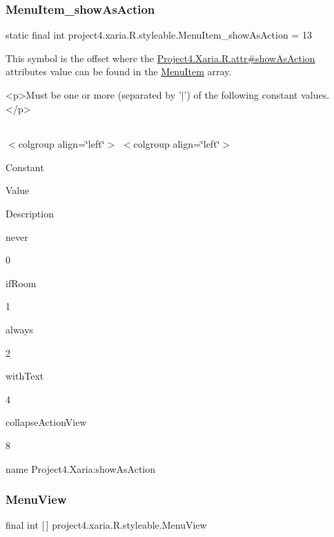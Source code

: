 \subsubsection{\texorpdfstring{Menu\+Item\+\_\+show\+As\+Action}{MenuItem\_showAsAction}}
{\footnotesize\ttfamily static final int project4.\+xaria.\+R.\+styleable.\+Menu\+Item\+\_\+show\+As\+Action = 13\hspace{0.3cm}{\ttfamily [static]}}

This symbol is the offset where the \hyperlink{}{Project4.\+Xaria.\+R.\+attr\#show\+As\+Action} attribute\textquotesingle{}s value can be found in the \hyperlink{classproject4_1_1xaria_1_1R_1_1styleable_a8a573827fcaba6497e560662224b5530}{Menu\+Item} array.

\begin{DoxyVerb}      <p>Must be one or more (separated by '|') of the following constant values.</p>
\end{DoxyVerb}
 \tabulinesep=1mm
\begin{longtabu} spread 0pt [c]{*{0}{|X[-1]}|}
\hline
\end{longtabu}
$<$colgroup align=\char`\"{}left\char`\"{}$>$ $<$colgroup align=\char`\"{}left\char`\"{}$>$ 

Constant

Value

Description 

{\ttfamily never}

0

{\ttfamily if\+Room}

1

{\ttfamily always}

2

{\ttfamily with\+Text}

4

{\ttfamily collapse\+Action\+View}

8

name Project4.\+Xaria\+:show\+As\+Action \mbox{\label{classproject4_1_1xaria_1_1R_1_1styleable_ac1aef922f3c93d63048c893762b0dbda}} 
\subsubsection{\texorpdfstring{Menu\+View}{MenuView}}
{\footnotesize\ttfamily final int \mbox{[}$\,$\mbox{]} project4.\+xaria.\+R.\+styleable.\+Menu\+View\hspace{0.3cm}{\ttfamily [static]}}

